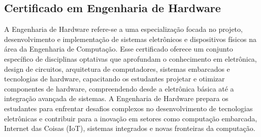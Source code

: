 \subsection{Certificado em Engenharia de Hardware}

A Engenharia de Hardware refere-se a uma especialização focada no projeto, desenvolvimento e implementação de sistemas eletrônicos e dispositivos físicos na área da Engenharia de Computação. Esse certificado oferece um conjunto específico de disciplinas optativas que aprofundam o conhecimento em eletrônica, design de circuitos, arquitetura de computadores, sistemas embarcados e tecnologias de hardware, capacitando os estudantes projetar e otimizar componentes de hardware, compreendendo desde a eletrônica básica até a integração avançada de sistemas. A Engenharia de Hardware prepara os estudantes para enfrentar desafios complexos no desenvolvimento de tecnologias eletrônicas e contribuir para a inovação em setores como computação embarcada, Internet das Coisas (IoT), sistemas integrados e novas fronteiras da computação.



